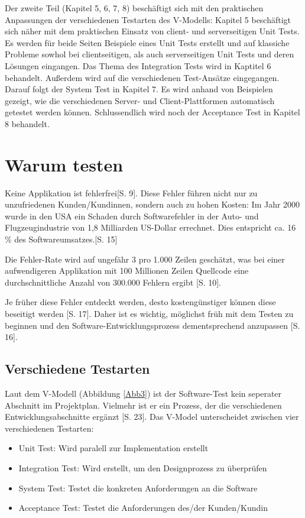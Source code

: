 \documentclass[a4paper,bibtotoc,oneside]{scrbook}
\begin{document}
Der zweite Teil (Kapitel 5, 6, 7, 8) beschäftigt sich mit den praktischen Anpassungen der verschiedenen Testarten des V-Modells: Kapitel 5 beschäftigt sich näher mit dem praktischen Einsatz von client- und serverseitigen Unit Tests. Es werden für beide Seiten Beispiele eines Unit Tests erstellt und auf klassiche Probleme sowhol bei clientseitigen, als auch serverseitigen Unit Tests und deren Lösungen eingangen. Das Thema des Integration Tests wird in Kaptitel 6 behandelt. Außerdem wird auf die verschiedenen Test-Ansätze eingegangen. Darauf folgt der System Test in Kapitel 7. Es wird anhand von Beispielen gezeigt, wie die verschiedenen Server- und Client-Plattformen automatisch getestet werden können. Schlussendlich wird noch der Acceptance Test in Kapitel 8 behandelt.

\chapter{Warum testen}
Keine Applikation ist fehlerfrei\cite{empiric_invest}[S. 9]. Diese Fehler  führen nicht nur zu unzufriedenen Kunden/Kundinnen, sondern auch zu hohen Kosten: \glqq Im Jahr 2000 wurde in den USA ein Schaden durch Softwarefehler in der Auto- und Flugzeugindustrie von 1,8 Milliarden US-Dollar errechnet. Dies entspricht ca. 16 \% des Softwareumsatzes.\grqq\cite{betrieb}[S. 15]

Die Fehler-Rate wird auf ungefähr 3 pro 1.000 Zeilen geschätzt, was bei einer aufwendigeren Applikation mit 100 Millionen Zeilen Quellcode eine durchschnittliche Anzahl von 300.000 Fehlern ergibt \cite{eval_regression}[S. 10]. 

Je früher diese Fehler entdeckt werden, desto kostengünstiger können diese beseitigt werden \cite{betrieb}[S. 17]. Daher ist es wichtig, möglichst früh mit dem Testen zu beginnen und den Software-Entwicklungsprozess dementsprechend anzupassen \cite{betrieb}[S. 16]. 

\section{Verschiedene Testarten}
Laut dem V-Modell (Abbildung \ref{Abb3}) ist der Software-Test kein seperater Abschnitt im Projektplan. Vielmehr ist er ein Prozess, der die verschiedenen Entwicklungsabschnitte ergänzt \cite{betrieb}[S. 23]. Das V-Model unterscheidet zwischen vier verschiedenen Testarten:

\begin{itemize}
	\item Unit Test: Wird paralell zur Implementation erstellt
	\item Integration Test: Wird erstellt, um den Designprozess zu überprüfen
	\item System Test: Testet die konkreten Anforderungen an die Software
	\item Acceptance Test: Testet die Anforderungen des/der Kunden/Kundin
\end{itemize}
\end{document}
